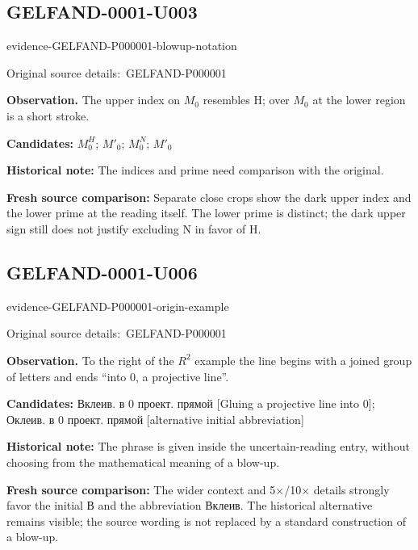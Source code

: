 \documentclass[11pt]{article}
\newcommand{\EvidenceBlock}[4]{%
 \par\smallskip\noindent\begin{minipage}{\linewidth}
 \begin{minipage}[t]{.47\linewidth}\vspace{0pt}\centering
 \csname evidence-#1-#2\endcsname\par
 {\scriptsize\SourceCropCaption\ #1}\par
 \end{minipage}\hfill
 \begin{minipage}[t]{.49\linewidth}\vspace{0pt}\raggedright
 {\small\color{orange!65!black}\textbf{#4} #3}\par
 \end{minipage}
 \end{minipage}\par\smallskip}
\newcommand{\SourceCropCaption}{Original source details:}\newcommand{\ReadingCaption}{Uncertain reading.}\newcommand{\IncompleteCaption}{Undeciphered passage.}\newcommand{\DiagramCaption}{Diagram and typed description.}
\begin{document}
\subsection*{GELFAND-0001-U003}
\EvidenceBlock{GELFAND-P000001}{blowup-notation}{The upper index on \(M_0\) resembles H; over \(M_0\) at the lower region is a short stroke.}{Observation.}
\par\smallskip\noindent\textbf{Candidates: } \(M_0^H\); \(M'_0\); \(M_0^N\); \(M'_0\)\par
\par\smallskip\noindent\textbf{Historical note: } The indices and prime need comparison with the original.\par
\par\smallskip\noindent\textbf{Fresh source comparison: } Separate close crops show the dark upper index and the lower prime at the reading itself. The lower prime is distinct; the dark upper sign still does not justify excluding N in favor of H.\par
\subsection*{GELFAND-0001-U006}
\EvidenceBlock{GELFAND-P000001}{origin-example}{To the right of the \(R^2\) example the line begins with a joined group of letters and ends “into 0, a projective line”.}{Observation.}
\par\smallskip\noindent\textbf{Candidates: } Вклеив. в 0 проект. прямой [Gluing a projective line into 0]; Оклеив. в 0 проект. прямой [alternative initial abbreviation]\par
\par\smallskip\noindent\textbf{Historical note: } The phrase is given inside the uncertain-reading entry, without choosing from the mathematical meaning of a blow-up.\par
\par\smallskip\noindent\textbf{Fresh source comparison: } The wider context and 5×/10× details strongly favor the initial В and the abbreviation Вклеив. The historical alternative remains visible; the source wording is not replaced by a standard construction of a blow-up.\par
\end{document}
